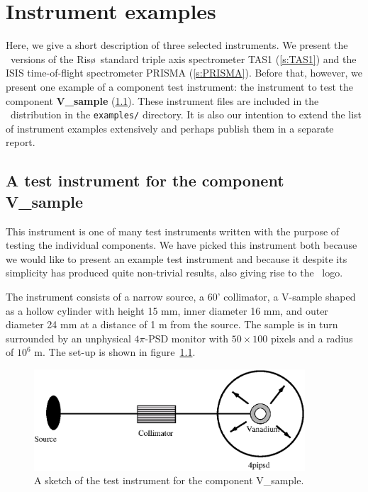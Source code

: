 
\chapter{Instrument examples}
\label{s:instrument}

Here, we give a short description of three selected
instruments. We present the \MCS\ versions of
the Ris\o\ standard triple axis spectrometer TAS1 (\ref{s:TAS1})
and the ISIS time-of-flight spectrometer PRISMA (\ref{s:PRISMA}).
Before that, however, we present one example of a component
test instrument: the instrument to test the component
{\bf V\_sample} (\ref{s:V-instr}).
%
These instrument files are included in the \MCS\ distribution
in the \verb+examples/+ directory.
It is also our intention to extend the list of instrument examples extensively
and perhaps publish them in a separate report.

\section{A test instrument for the component V\_sample}
\label{s:V-instr}
This instrument is one of many test instruments written with the
purpose of testing the individual components. We have picked 
this instrument both because we would like to present an
example test instrument and because it despite its simplicity
has produced quite non-trivial results, also giving rise to 
the \MCS\ logo.%

The instrument consists of a narrow source, 
a 60' collimator, a V-sample shaped as a hollow cylinder
with height 15 mm, inner diameter 16 mm, and outer diameter 24 mm
at a distance of 1 m from the source. 
The sample is in turn surrounded by an unphysical $4\pi$-PSD
monitor with $50 \times 100$ pixels and a radius of $10^{6}$ m. 
The set-up is shown in figure~\ref{f:V-instr}.

\begin{figure}
  \begin{center}
    \includegraphics[width=0.9\textwidth]{figures/vanadium.eps}
  \end{center}
\caption{A sketch of the test instrument for the component
V\_sample.}
\label{f:V-instr}
\end{figure}

